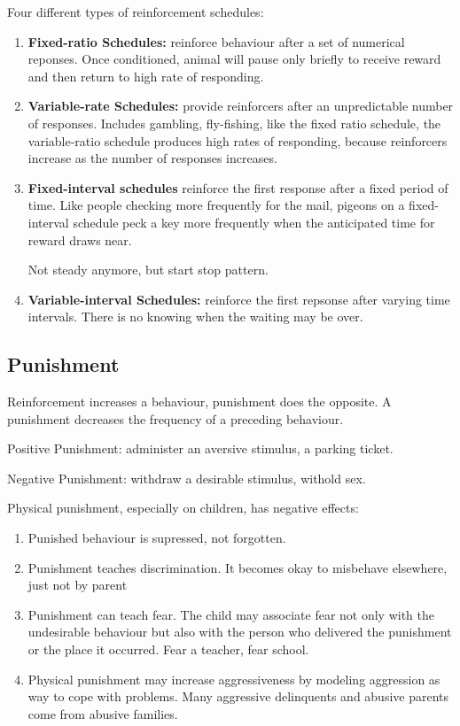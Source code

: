 \documentclass[12pt]{article}
\begin{document}
Four different types of reinforcement schedules: 
\begin{enumerate}
\item \textbf{Fixed-ratio Schedules:} reinforce behaviour after a set of numerical reponses. Once conditioned, animal will pause only briefly to receive reward and then return to high rate of responding.

\item \textbf{Variable-rate Schedules:} provide reinforcers after an unpredictable number of responses. Includes gambling, fly-fishing, like the fixed ratio schedule, the variable-ratio schedule produces high rates of responding, because reinforcers increase as the number of responses increases. 

\item \textbf{Fixed-interval schedules} reinforce the first response after a fixed period of time. Like people checking more frequently for the mail, pigeons on a fixed- interval schedule peck a key more frequently when the anticipated time for reward draws near.

Not steady anymore, but start stop pattern.

\item \textbf{Variable-interval Schedules:} reinforce the first repsonse after varying time intervals. There is no knowing when the waiting may be over.
\end{enumerate}

\subsection*{Punishment}
Reinforcement increases a behaviour, punishment does the opposite. A punishment decreases the frequency of a preceding behaviour.

Positive Punishment: administer an aversive stimulus, a parking ticket.

Negative Punishment: withdraw a desirable stimulus, withold sex.

Physical punishment, especially on children, has negative effects:

\begin{enumerate}
\item Punished behaviour is supressed, not forgotten. 
\item Punishment teaches discrimination. It becomes okay to misbehave elsewhere, just not by parent
\item Punishment can teach fear. The child may associate fear not only with the undesirable behaviour but also with the person who delivered the punishment or the place it occurred. Fear a teacher, fear school.
\item Physical punishment may increase aggressiveness by modeling aggression as way to cope with problems. Many aggressive delinquents and abusive parents come from abusive families. 
\end{enumerate}
\end{document}
